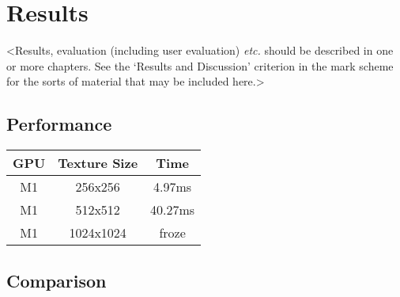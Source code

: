 \chapter{Results}
\label{chapter3}

<Results, evaluation (including user evaluation) {\em etc.} should be described in one or more chapters. See the `Results and Discussion' criterion in the mark scheme for the sorts of material that may be included here.>
\section{Performance}

\begin{table}[h]
    \centering
    \begin{tabular}{|c|c|c|}
        \hline
        \textbf{GPU} & \textbf{Texture Size} & \textbf{Time} \\
        \hline
        M1 & 256x256 & 4.97ms \\
        \hline
        M1 & 512x512 & 40.27ms \\
        \hline
        M1 & 1024x1024 & froze \\
        \hline
    \end{tabular}
\end{table}

\section{Comparison}
